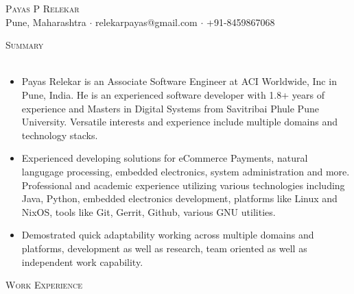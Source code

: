 \documentclass[a4paper]{article}
\newcommand{\lineunder} {
    \vspace*{-8pt} \\
    \hspace*{-18pt} \hrulefill \\
}
\newcommand{\header} [1] {
    {\hspace*{-18pt}\vspace*{6pt} \textsc{#1}}
    \vspace*{-6pt} \lineunder
}
\begin{document}
\vspace*{-40pt}

\vspace*{-10pt}
\begin{center}
	{\Huge \scshape {Payas P Relekar}}\\
	Pune, Maharashtra $\cdot$ relekarpayas@gmail.com $\cdot$ +91-8459867068\\
\end{center}

\header{Summary}
\vspace{1mm}

\begin{itemize} \itemsep 1pt
  \item Payas Relekar is an Associate Software Engineer at ACI Worldwide, Inc in Pune, India. He is an experienced software developer with 1.8+ years of experience and Masters in Digital Systems from Savitribai Phule Pune University. Versatile interests and experience include multiple domains and technology stacks.
  \item Experienced developing solutions for eCommerce Payments, natural langugage processing, embedded electronics, system administration and more. Professional and academic experience utilizing various technologies including Java, Python, embedded electronics development, platforms like Linux and NixOS, tools like Git, Gerrit, Github, various GNU utilities.
  \item Demostrated quick adaptability working across multiple domains and platforms, development as well as research, team oriented as well as independent work capability.
\end{itemize}

\header{Work Experience}
\vspace{1mm}
\end{document}
